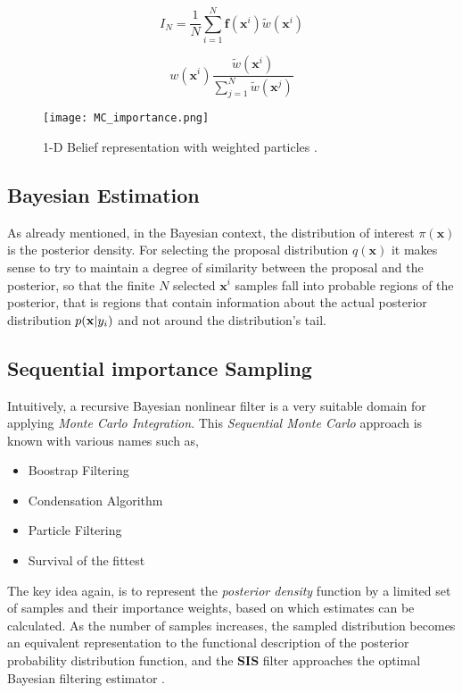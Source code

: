 \begin{equation}\label{eq:MCSM}
	I_N = \frac{1}{N} \sum_{i=1}^{N} \mathbf{f}(\mathbf{x}^i) \tilde{w}(\mathbf{x}^i)
\end{equation}



\begin{equation}\label{eq:weight_normalize}
w(\mathbf{x}^i)  \frac{\tilde{w}(\mathbf{x}^i)}{\sum_{j=1}^N \tilde{w}(\mathbf{x}^j)}
\end{equation}

\begin{figure}[H]
	\centering
	\texttt{[image: MC\_importance.png]}
	\caption{1-D Belief representation with weighted particles \cite{Rao2013}.}
	\label{fig:1d_belief}
\end{figure}

\subsection{Bayesian Estimation}

As already mentioned, in the Bayesian context, the distribution of interest $\pi (\mathbf{x})$ is the posterior density. For selecting the proposal distribution $q(\mathbf{x})$ it makes sense to try to maintain a degree of similarity between the proposal and the posterior, so that the finite $N$ selected $\mathbf{x}^i$ samples fall into probable regions of the posterior, that is regions that contain information about the actual posterior distribution $p(\mathbf{x} | {{y}}_i)$ and not around the distribution's tail.
\subsection{Sequential importance Sampling}


Intuitively, a recursive Bayesian nonlinear filter is a very suitable domain for applying \emph{Monte Carlo Integration}. This \emph{Sequential Monte Carlo} approach is known with various names \cite{Ristic2004} such as,

\begin{itemize}
	\item Boostrap Filtering
	\item Condensation Algorithm
	\item Particle Filtering
	\item Survival of the fittest
\end{itemize}

The key idea again, is to represent the \emph{posterior density} function by a limited set of samples and their importance weights, based on which estimates can be calculated. As the number of samples increases, the sampled distribution becomes an equivalent representation to the functional description of the posterior probability distribution function, and the \textbf{SIS} filter approaches the optimal Bayesian filtering estimator \cite{Ristic2004}.


